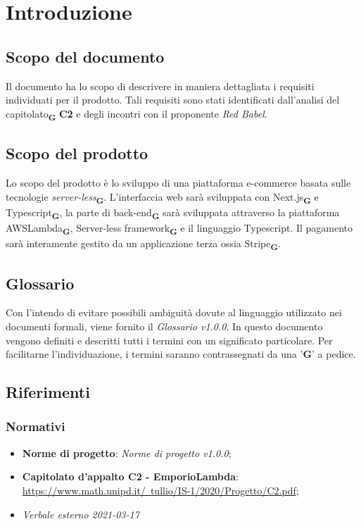 \section{Introduzione}
    \subsection{Scopo del documento}
    Il documento ha lo scopo di descrivere in maniera dettagliata i requisiti individuati per il prodotto. Tali requisiti sono stati identificati dall'analisi del capitolato\textsubscript{\textbf{G}} \textbf{C2} e degli incontri con il proponente \textit{Red Babel}.
    \subsection{Scopo del prodotto}
    Lo scopo del prodotto è lo sviluppo di una piattaforma e-commerce basata sulle tecnologie \textit{server-less}\textsubscript{\textbf{G}}. L'interfaccia web sarà sviluppata con Next.js\textsubscript{\textbf{G}} e Typescript\textsubscript{\textbf{G}}, la parte di back-end\textsubscript{\textbf{G}} sarà sviluppata attraverso la piattaforma AWSLambda\textsubscript{\textbf{G}}, Server-less framework\textsubscript{\textbf{G}} e il linguaggio Typescript. Il pagamento sarà interamente gestito da un applicazione terza ossia Stripe\textsubscript{\textbf{G}}.
    \subsection{Glossario}
    Con l'intendo di evitare possibili ambiguità dovute al linguaggio utilizzato nei documenti formali, viene fornito il \textit{Glossario v1.0.0}. In questo documento vengono definiti e descritti tutti i termini con un significato particolare. Per facilitarne l'individuazione, i termini saranno contrassegnati da una '\textbf{G}' a pedice.
    \subsection{Riferimenti}
    \subsubsection{Normativi}
    \begin{itemize}
        \item \textbf{Norme di progetto}: \textit{Norme di progetto v1.0.0};
        \item \textbf{Capitolato d'appalto C2 - EmporioLambda}:\\ \href{https://www.math.unipd.it/~tullio/IS-1/2020/Progetto/C2.pdf}{https://www.math.unipd.it/~tullio/IS-1/2020/Progetto/C2.pdf};
        \item \textit{Verbale esterno 2021-03-17}
    \end{itemize}
